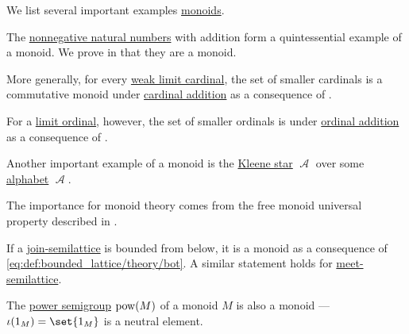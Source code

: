 \begin{example}\label{ex:def:monoid}
  We list several important examples \hyperref[def:monoid]{monoids}.

  \begin{thmenum}
     The \hyperref[def:natural_numbers]{nonnegative natural numbers} with addition form a quintessential example of a monoid. We prove in  that they are a monoid.

     More generally, for every \hyperref[def:successor_and_limit_cardinal/weak_limit]{weak limit cardinal}, the set of smaller cardinals is a commutative monoid under \hyperref[def:cardinal_arithmetic/addition]{cardinal addition} as a consequence of .

     For a \hyperref[def:successor_and_limit_ordinal]{limit ordinal}, however, the set of smaller ordinals is  under \hyperref[def:ordinal_arithmetic/addition]{ordinal addition} as a consequence of .

     Another important example of a monoid is the \hyperref[def:formal_language/kleene_star]{Kleene star} \( \mscrA \) over some \hyperref[def:formal_language]{alphabet} \( \mscrA \).

    The importance for monoid theory comes from the free monoid universal property described in .

     If a \hyperref[def:semilattice]{join-semilattice} is bounded from below, it is a monoid as a consequence of \eqref{eq:def:bounded_lattice/theory/bot}. A similar statement holds for \hyperref[def:lattice/meet]{meet-semilattice}.

     The \hyperref[def:power_semigroup]{power semigroup} \( \operatorname{pow}(M) \) of a monoid \( M \) is also a monoid --- \( \iota(1_M) = \set{ 1_M } \) is a neutral element.
  \end{thmenum}
\end{example}

